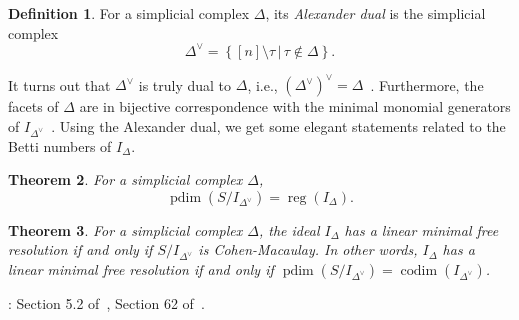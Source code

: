 \documentclass[12pt,a4paper]{article}
\DeclareMathOperator{\codim}{codim}
\DeclareMathOperator{\pdim}{pdim}
\DeclareMathOperator{\reg}{reg}
\newtheorem{theorem}{Theorem}[section]
\theoremstyle{definition}
\newtheorem{definition}[theorem]{Definition}
\numberwithin{equation}{section}
\begin{document}
\begin{definition}{\cite[Construction 62.2]{peeva_graded_2011}}
    For a simplicial complex $\Delta$, its \emph{Alexander dual} is the simplicial complex
    \begin{equation*}
        \Delta^{\vee} = \left\{ [n] \setminus \tau \, \vert \, \tau \not\in \Delta \right\}.
    \end{equation*}
\end{definition}

It turns out that $\Delta^{\vee}$ is truly dual to $\Delta$, i.e., $(\Delta^{\vee})^{\vee} = \Delta$~\cite[Exercise 62.3]{peeva_graded_2011}.
Furthermore, the facets of $\Delta$ are in bijective correspondence with the minimal monomial generators of $I_{\Delta^{\vee}}$~\cite[Exercise 62.4]{peeva_graded_2011}.
Using the Alexander dual, we get some elegant statements related to the Betti numbers of $I_\Delta$.

\begin{theorem}{\cite{terai_alexander_1999, bayer_extremal_1999}}
    For a simplicial complex $\Delta$,
    \begin{equation*}
        \pdim(S / I_{\Delta^{\vee}}) = \reg(I_\Delta).
    \end{equation*}
\end{theorem}

\begin{theorem}{\cite{eagon_resolutions_1998}}
    For a simplicial complex $\Delta$, the ideal $I_\Delta$ has a linear minimal free resolution if and only if $S / I_{\Delta^{\vee}}$ is Cohen-Macaulay.
    In other words, $I_\Delta$ has a linear minimal free resolution if and only if $\pdim(S / I_{\Delta^\vee}) = \codim(I_{\Delta^\vee})$.
\end{theorem}

\vspace*{1cm}

: Section 5.2 of~\cite{schenck_computational_2003}, Section 62 of~\cite{peeva_graded_2011}.

\vspace*{1cm}
\end{document}
